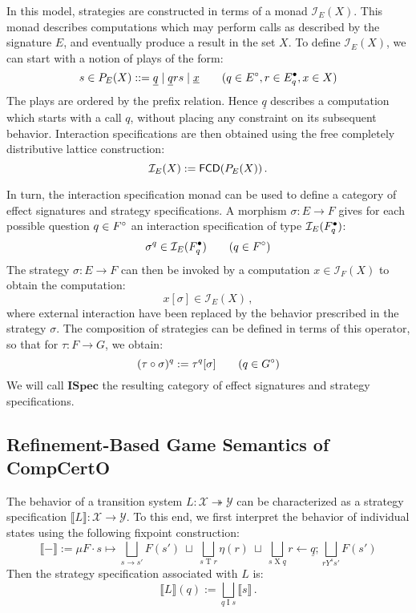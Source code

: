 \documentclass[acmsmall,review,anonymous]{acmart}\settopmatter{printfolios=true,printccs=false,printacmref=false}
\newcommand{\ISpec}{\mathbf{ISpec}}
\begin{document}
In this model,
strategies are constructed in terms of a monad $\mathcal{I}_E(X)$.
This monad describes computations
which may perform calls as described by the signature $E$,
and eventually produce a result in the set $X$.
To define $\mathcal{I}_E(X)$,
we can start with a notion of plays of the form:
\[
  s \in P_E(X) ::=
    \underline{q} \mid
    \underline{q}rs \mid
    \underline{x}
  \qquad
  (q \in E^\circ, r \in E^\bullet_q, x \in X)
\]
The plays are ordered by the prefix relation.
Hence $\underline{q}$ describes a computation
which starts with a call $q$,
without placing any constraint on its subsequent behavior.
Interaction specifications are then obtained
using the free completely distributive lattice construction:
\[
  \mathcal{I}_E(X) :=  \mathsf{FCD} (P_E(X)) \,.
\]

In turn,
the interaction specification monad can be used to define
a category of effect signatures and strategy specifications.
A morphism $\sigma : E \rightarrow F$
gives for each possible question $q \in F^\circ$
an interaction specification of type $\mathcal{I}_E(F^\bullet_q)$:
\[
  \sigma^q \in \mathcal{I}_E(F^\bullet_q)
  \qquad
  (q \in F^\circ)
\]
The strategy $\sigma : E \rightarrow F$
can then be invoked by a computation $x \in \mathcal{I}_F(X)$
to obtain the computation:
\[
  x[\sigma] \in \mathcal{I}_E(X) \,,
\]
where external interaction have been
replaced by the behavior prescribed in
the strategy $\sigma$.
The composition of strategies can be defined
in terms of this operator,
so that for $\tau : F \rightarrow G$,
we obtain:
\[
  (\tau \circ \sigma)^q := \tau^q[\sigma]
  \qquad
  (q \in G^\circ)
\]
We will call $\ISpec$ the resulting category
of effect signatures and strategy specifications.


\subsection{Refinement-Based Game Semantics of CompCertO}

The behavior of a transition system
$L : \mathcal{X} \twoheadrightarrow \mathcal{Y}$
can be characterized as a strategy specification
$\llbracket L \rrbracket : \mathcal{X} \rightarrow \mathcal{Y}$.
To this end,
we first interpret the behavior of individual states
using the following fixpoint construction:
\[
  \llbracket - \rrbracket :=
  \mu F \cdot s \mapsto
   \bigsqcup_{s \rightarrow s'} F(s') \: \sqcup \:
   \bigsqcup_{s \mathrel{T} r} \eta(r) \: \sqcup \:
   \bigsqcup_{s \mathrel{X} q}
    r \mathbin\leftarrow \underline{q} \mathbin;
    \bigsqcup_{r \mathrel{Y^s} s'} F(s')
\]
Then the strategy specification associated with $L$ is:
\[
  \llbracket L \rrbracket(q) :=
    \bigsqcup_{q \mathrel{I} s} \llbracket s \rrbracket
    \,.
\]
\end{document}
